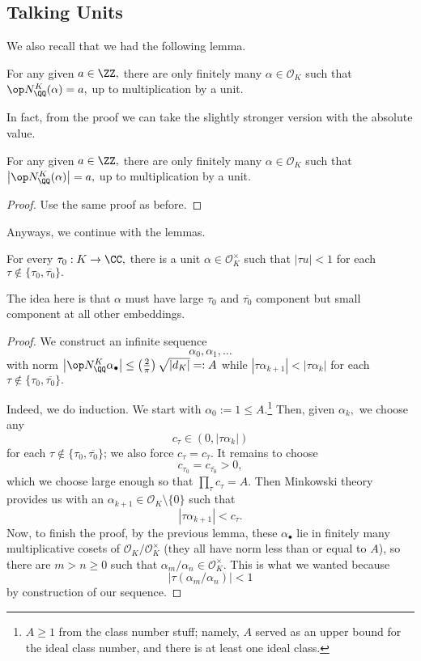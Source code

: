 \subsection{Talking Units}
We also recall that we had the following lemma.
\begin{lemma}
    For any given $a\in\ZZ,$ there are only finitely many $\alpha\in\mathcal O_K$ such that $\op N_\QQ^K(\alpha)=a,$ up to multiplication by a unit.
\end{lemma}
In fact, from the proof we can take the slightly stronger version with the absolute value.
\begin{lemma}
    For any given $a\in\ZZ,$ there are only finitely many $\alpha\in\mathcal O_K$ such that $\left|\op N_\QQ^K(\alpha)\right|=a,$ up to multiplication by a unit.
\end{lemma}
\begin{proof}
    Use the same proof as before.
\end{proof}
Anyways, we continue with the lemmas.
\begin{lemma} \label{lem:makecols}
    For every $\tau_0:K\to\CC,$ there is a unit $\alpha\in\mathcal O_K^\times$ such that $|\tau u|<1$ for each $\tau\notin\{\tau_0,\overline{\tau_0}\}.$
\end{lemma}
The idea here is that $\alpha$ must have large $\tau_0$ and $\overline{\tau_0}$ component but small component at all other embeddings.
\begin{proof}
    We construct an infinite sequence
    \[\alpha_0,\alpha_1,\ldots\]
    with norm $\left|\op N_\QQ^K\alpha_\bullet\right|\le\left(\frac2\pi\right)\sqrt{|d_K|}=:A$ while $|\tau\alpha_{k+1}|<|\tau\alpha_k|$ for each $\tau\notin\{\tau_0,\overline{\tau_0}\}.$

    Indeed, we do induction. We start with $\alpha_0:=1\le A.$\footnote{$A\ge1$ from the class number stuff; namely, $A$ served as an upper bound for the ideal class number, and there is at least one ideal class.} Then, given $\alpha_k,$ we choose any
    \[c_\tau\in(0,|\tau\alpha_k|)\]
    for each $\tau\notin\{\tau_0,\overline{\tau_0}\}$; we also force $c_\tau=c_{\overline\tau}.$ It remains to choose
    \[c_{\tau_0}=c_{\overline{\tau_0}}>0,\]
    which we choose large enough so that $\prod_\tau c_\tau=A.$ Then Minkowski theory provides us with an $\alpha_{k+1}\in\mathcal O_K\setminus\{0\}$ such that
    \[|\tau\alpha_{k+1}|<c_\tau.\]
    Now, to finish the proof, by the previous lemma, these $\alpha_\bullet$ lie in finitely many multiplicative cosets of $\mathcal O_K/\mathcal O_K^\times$ (they all have norm less than or equal to $A$), so there are $m>n\ge0$ such that $\alpha_m/\alpha_n\in\mathcal O_K^\times.$ This is what we wanted because
    \[|\tau(\alpha_m/\alpha_n)|<1\]
    by construction of our sequence.
\end{proof}
